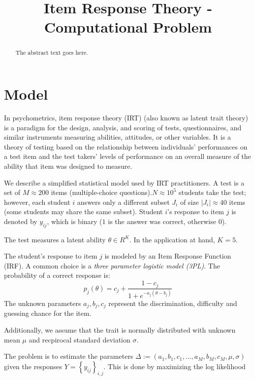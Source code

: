 \documentclass{article}
\begin{document}
\title{Item Response Theory - Computational Problem}

\maketitle

\begin{abstract}
The abstract text goes here.
\end{abstract}

\section{Model}
In psychometrics, item response theory (IRT) (also known as latent trait theory) is a paradigm for the design, analysis, and scoring of tests, questionnaires, and similar instruments measuring abilities, attitudes, or other variables. It is a theory of testing based on the relationship between individuals' performances on a test item and the test takers' levels of performance on an overall measure of the ability that item was designed to measure.

We describe a simplified statistical model used by IRT practitioners. A test is a set of $M \approx 200$ items (multiple-choice questions).$N \approx 10^5$ students take the test; however, each student $i$ answers only a different subset $J_i$ of size $|J_i| \approx 40$ items (some students may share the same subset). Student $i$'s response to item $j$ is denoted by $y_{ij}$, which is binary ($1$ is the answer was correct, otherwise $0$).

The test measures a latent ability $\theta \in R^K$. In the application at hand, $K=5$.

The student's response to item $j$ is modeled by an Item Response Function (IRF). A common choice is a {\it three parameter logistic model (3PL)}. The probability of a correct response is:
\begin{equation}
  p_j(\theta) = c_j + \frac{1 - c_j}{1 + e^{-a_j (\theta - b_j)}}
\end{equation}
The unknown parameters $a_j, b_j, c_j$ represent the discrimination, difficulty and guessing chance for the item.

Additionally, we assume that the trait is normally distributed with unknown mean $\mu$ and recpirocal standard deviation $\sigma$.

The problem is to estimate the parameters $\Delta := (a_1,  b_1, c_1, \dots, a_M, b_M, c_M, \mu, \sigma)$ given the responses $Y = \left\{ y_{ij} \right\}_{i,j}$. This is done by maximizing the log likelihood
\end{document}
